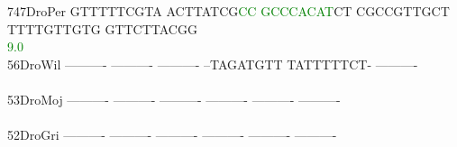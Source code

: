 \documentclass[11pt,twoside,reqno,a4paper]{article}
\begin{document}
{747\hspace*{2\charwidth}DroPer	GTTTTTCGTA	ACTTATCG\textcolor{green}{C}\textcolor{green}{C}	\textcolor{green}{G}\textcolor{green}{C}\textcolor{green}{C}\textcolor{green}{C}\textcolor{green}{A}\textcolor{green}{C}\textcolor{green}{A}\textcolor{green}{T}CT	CGCCGTTGCT	TTTTGTTGTG	GTTCTTACGG	\\
\hspace*{5\charwidth}\hspace*{7\charwidth}\hspace*{1\charwidth}\hspace*{18\charwidth}\textcolor{green}{9.0}\hspace*{1\charwidth}\hspace*{1\charwidth}\hspace*{1\charwidth}\hspace*{1\charwidth}\hspace*{1\charwidth}\\
56\hspace*{3\charwidth}DroWil	----------	----------	----------	--TAGATGTT	TATTTTTCT-	----------	\\
\hspace*{5\charwidth}\hspace*{7\charwidth}\hspace*{1\charwidth}\hspace*{1\charwidth}\hspace*{1\charwidth}\hspace*{1\charwidth}\hspace*{1\charwidth}\hspace*{1\charwidth}\\
53\hspace*{3\charwidth}DroMoj	----------	----------	----------	----------	----------	----------	\\
\hspace*{5\charwidth}\hspace*{7\charwidth}\hspace*{1\charwidth}\hspace*{1\charwidth}\hspace*{1\charwidth}\hspace*{1\charwidth}\hspace*{1\charwidth}\hspace*{1\charwidth}\\
52\hspace*{3\charwidth}DroGri	----------	----------	----------	----------	----------	----------	\\
\hspace*{5\charwidth}\hspace*{7\charwidth}\hspace*{1\charwidth}\hspace*{1\charwidth}\hspace*{1\charwidth}\hspace*{1\charwidth}\hspace*{1\charwidth}\hspace*{1\charwidth}\\
}
\end{document}
